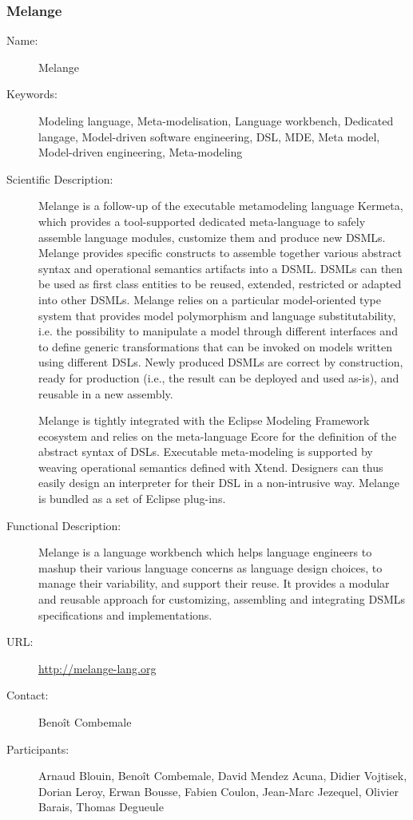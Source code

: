 \subsubsection{Melange}
\label{bil-2731}
\begin{description}
\item[Name:] Melange
\item[Keywords:] Modeling language, Meta-modelisation, Language workbench, Dedicated langage, Model-driven software engineering, DSL, MDE, Meta model, Model-driven engineering, Meta-modeling
\item[Scientific Description:]
Melange is a follow-up of the executable metamodeling language Kermeta, which provides a tool-supported dedicated meta-language to safely assemble language modules, customize them and produce new DSMLs. Melange provides specific constructs to assemble together various abstract syntax and operational semantics artifacts into a DSML. DSMLs can then be used as first class entities to be reused, extended, restricted or adapted into other DSMLs. Melange relies on a particular model-oriented type system that provides model polymorphism and language substitutability, i.e. the possibility to manipulate a model through different interfaces and to define generic transformations that can be invoked on models written using different DSLs. Newly produced DSMLs are correct by construction, ready for production (i.e., the result can be deployed and used as-is), and reusable in a new assembly.

Melange is tightly integrated with the Eclipse Modeling Framework ecosystem and relies on the meta-language Ecore for the definition of the abstract syntax of DSLs. Executable meta-modeling is supported by weaving operational semantics defined with Xtend. Designers can thus easily design an interpreter for their DSL in a non-intrusive way. Melange is bundled as a set of Eclipse plug-ins.
\item[Functional Description:]
Melange is a language workbench which helps language engineers to mashup their various language concerns as language design choices, to manage their variability, and support their reuse. It provides a modular and reusable approach for customizing, assembling and integrating DSMLs specifications and implementations.




\item[URL:] \url{http://melange-lang.org}
\item[Contact:] Benoît Combemale
\item[Participants:] Arnaud Blouin, Benoît Combemale, David Mendez Acuna, Didier Vojtisek, Dorian Leroy, Erwan Bousse, Fabien Coulon, Jean-Marc Jezequel, Olivier Barais, Thomas Degueule
\end{description}

